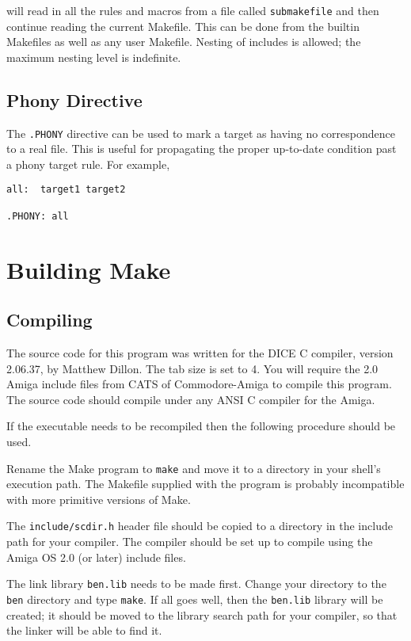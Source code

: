 will read in all the rules and macros from a file called {\tt submakefile}
and then continue reading the current Makefile.  This can be done from the
builtin Makefiles as well as any user Makefile.  Nesting of includes is
allowed; the maximum nesting level is indefinite.

\section{Phony Directive}

The {\tt .PHONY} directive can be used to mark a target as having no
correspondence to a real file.  This is useful for propagating the proper
up-to-date condition past a phony target rule.  For example,

\begin{verbatim}
all:  target1 target2

.PHONY: all
\end{verbatim}


\chapter{Building Make}

\section{Compiling}

The source code for this program was written for the DICE C compiler,
version 2.06.37, by Matthew Dillon.  The tab size is set to 4.  You will
require the 2.0 Amiga include files from CATS of Commodore-Amiga to compile
this program.  The source code should compile under any ANSI C compiler for
the Amiga.

If the executable needs to be recompiled then the following procedure
should be used.

Rename the Make program to {\tt make} and move it to a directory in your
shell's execution path.  The Makefile supplied with the program is probably
incompatible with more primitive versions of Make.

The {\tt include/scdir.h} header file should be copied to a directory in
the include path for your compiler.  The compiler should be set up to
compile using the Amiga OS 2.0 (or later) include files.

The link library {\tt ben.lib} needs to be made first.  Change your
directory to the {\tt ben} directory and type {\tt make}.  If all goes
well, then the {\tt ben.lib} library will be created; it should be moved to
the library search path for your compiler, so that the linker will be able
to find it.

